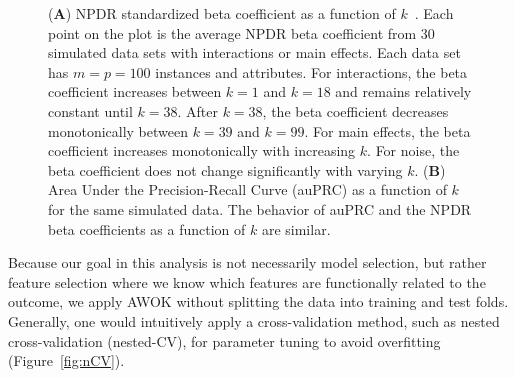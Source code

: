 \documentclass[10pt,letterpaper]{article}
\begin{document}
\begin{figure}[!bht]
\begin{minipage}[c]{0.48\textwidth}
\begin{tikzpicture}
	\end{tikzpicture}
\end{minipage}
\caption[NPDR standardized beta coefficients and Area Under the Precision-Recall Curve (auPRC) as a function of $k$ for simulated data]{(\textbf{A}) NPDR standardized beta coefficient as a function of $k$~\cite{npdr2}. Each point on the plot is the average NPDR beta coefficient from 30 simulated data sets with interactions or main effects. Each data set has $m=p=100$ instances and attributes. For interactions, the beta coefficient increases between $k=1$ and $k=18$ and remains relatively constant until $k=38$. After $k=38$, the beta coefficient decreases monotonically between $k=39$ and $k=99$. For main effects, the beta coefficient increases monotonically with increasing $k$. For noise, the beta coefficient does not change significantly with varying $k$. (\textbf{B}) Area Under the Precision-Recall Curve (auPRC) as a function of $k$ for the same simulated data. The behavior of auPRC and the NPDR beta coefficients as a function of $k$ are similar.}\label{fig:auPRC-vs-k}
\end{figure}




Because our goal in this analysis is not necessarily model selection, but rather feature selection where we know which features are functionally related to the outcome, we apply AWOK without splitting the data into training and test folds. Generally, one would intuitively apply a cross-validation method, such as nested cross-validation (nested-CV), for parameter tuning to avoid overfitting (Figure~\ref{fig:nCV}). 
\end{document}
